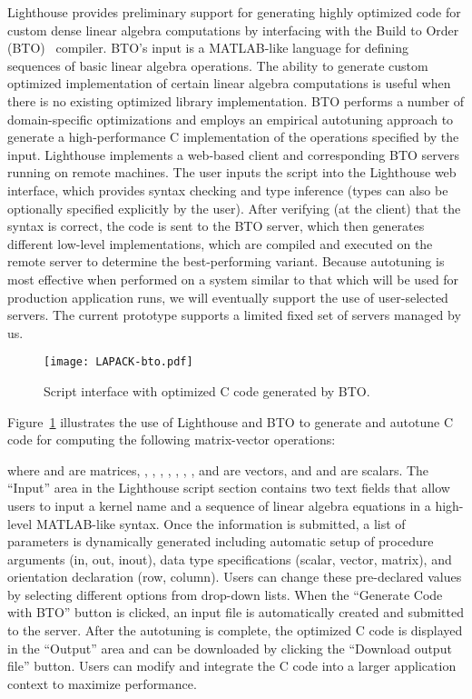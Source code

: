 \documentclass{sig-alternate}
\begin{document}
Lighthouse provides preliminary support for generating highly optimized code for custom dense linear algebra computations 
by interfacing with the Build to Order
(BTO)~\cite{Belter,Siek} compiler. BTO's input is a MATLAB-like language for defining sequences of basic linear algebra operations.
The ability to generate custom 
optimized implementation of certain linear algebra computations is useful when there is no existing optimized library implementation.
BTO performs a number of domain-specific optimizations and employs an empirical autotuning approach to generate a high-performance
C implementation of the operations specified by the input.
Lighthouse implements a web-based client and corresponding BTO servers running on remote machines. 
The user inputs the script into the Lighthouse
web interface, which provides syntax checking and type inference (types can also be optionally specified explicitly by the user). After
verifying (at the client) that the syntax is correct, the code is sent to the BTO server, which then generates different low-level
implementations, which 
are compiled and executed on the remote server to determine the best-performing variant.
Because autotuning is most effective when performed 
on a system similar to that which will be used for production application runs, we will eventually support the use of user-selected servers. 
The current prototype supports a limited fixed set of servers managed by us.

\begin{figure}[ht]
\centering
\texttt{[image: LAPACK-bto.pdf]}
\vspace{-5pt}
\caption{Script interface with optimized C code generated by BTO.}
\label{fig:bto}
\end{figure}

Figure~\ref{fig:bto} illustrates the use of Lighthouse and BTO to generate and autotune C code for computing the following matrix-vector operations:

where  and  are matrices, , , , , , , , and  are vectors, and  and  are scalars.
The ``Input'' area in the Lighthouse script section contains two text fields that allow users to input a kernel name and a sequence
of linear algebra equations in a high-level MATLAB-like syntax. Once the information is submitted, a list of parameters is dynamically
generated including automatic setup of procedure arguments (in, out, inout), data type specifications (scalar, vector, matrix), and
orientation declaration (row, column).  Users can change these pre-declared values by selecting different options from drop-down lists. When the
``Generate Code with BTO'' button is clicked, an input file is automatically created and submitted to the server. After the 
autotuning is complete, the
optimized C code is displayed in the ``Output'' area and can be downloaded by clicking the ``Download output file'' button. Users
can modify and integrate the C code into a larger application context to maximize performance. 
\end{document}
